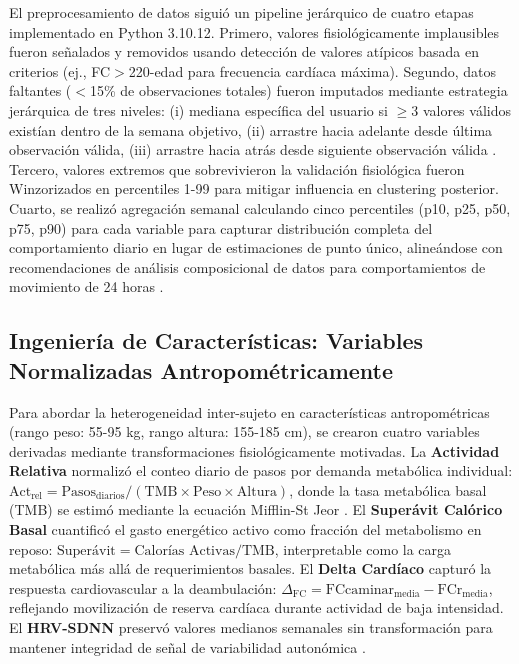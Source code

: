 \documentclass[journal,twoside,web]{ieeecolor}
\begin{document}
El preprocesamiento de datos siguió un pipeline jerárquico de cuatro etapas implementado en Python 3.10.12. Primero, valores fisiológicamente implausibles fueron señalados y removidos usando detección de valores atípicos basada en criterios (ej., FC$>$220-edad para frecuencia cardíaca máxima). Segundo, datos faltantes ($<$15\% de observaciones totales) fueron imputados mediante estrategia jerárquica de tres niveles: (i) mediana específica del usuario si $\geq$3 valores válidos existían dentro de la semana objetivo, (ii) arrastre hacia adelante desde última observación válida, (iii) arrastre hacia atrás desde siguiente observación válida \cite{Little1988,Azur2011}. Tercero, valores extremos que sobrevivieron la validación fisiológica fueron Winzorizados en percentiles 1-99 para mitigar influencia en clustering posterior. Cuarto, se realizó agregación semanal calculando cinco percentiles (p10, p25, p50, p75, p90) para cada variable para capturar distribución completa del comportamiento diario en lugar de estimaciones de punto único, alineándose con recomendaciones de análisis composicional de datos para comportamientos de movimiento de 24 horas \cite{Chastin2015,Dumuid2018}.

\subsection{Ingeniería de Características: Variables Normalizadas Antropométricamente}
\label{subsec:caracteristicas}

Para abordar la heterogeneidad inter-sujeto en características antropométricas (rango peso: 55-95 kg, rango altura: 155-185 cm), se crearon cuatro variables derivadas mediante transformaciones fisiológicamente motivadas. La \textbf{Actividad Relativa} normalizó el conteo diario de pasos por demanda metabólica individual: $\text{Act}_{\text{rel}} = \text{Pasos}_{\text{diarios}} / (\text{TMB} \times \text{Peso} \times \text{Altura})$, donde la tasa metabólica basal (TMB) se estimó mediante la ecuación Mifflin-St Jeor \cite{Mifflin1990}. El \textbf{Superávit Calórico Basal} cuantificó el gasto energético activo como fracción del metabolismo en reposo: $\text{Superávit} = \text{Calorías Activas} / \text{TMB}$, interpretable como la carga metabólica más allá de requerimientos basales. El \textbf{Delta Cardíaco} capturó la respuesta cardiovascular a la deambulación: $\Delta_{\text{FC}} = \text{FCcaminar}_{\text{media}} - \text{FCr}_{\text{media}}$, reflejando movilización de reserva cardíaca durante actividad de baja intensidad. El \textbf{HRV-SDNN} preservó valores medianos semanales sin transformación para mantener integridad de señal de variabilidad autonómica \cite{Shaffer2017}.
\end{document}
